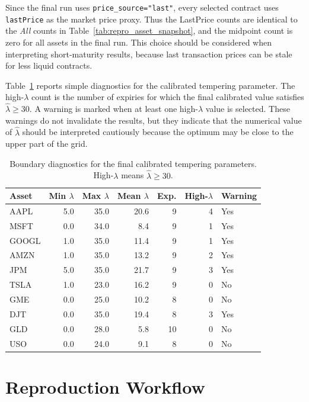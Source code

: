 \documentclass[11pt,a4paper]{report}
\begin{document}
Since the final run uses \texttt{price\_source="last"}, every selected contract uses \texttt{lastPrice} as the market price proxy. Thus the LastPrice counts are identical to the \textit{All} counts in Table~\ref{tab:repro_asset_snapshot}, and the midpoint count is zero for all assets in the final run. This choice should be considered when interpreting short-maturity results, because last transaction prices can be stale for less liquid contracts.

Table~\ref{tab:repro_boundary_diagnostics} reports simple diagnostics for the calibrated tempering parameter. The high-$\lambda$ count is the number of expiries for which the final calibrated value satisfies $\widehat{\lambda}\geq30$. A warning is marked when at least one high-$\lambda$ value is selected. These warnings do not invalidate the results, but they indicate that the numerical value of $\widehat{\lambda}$ should be interpreted cautiously because the optimum may be close to the upper part of the grid.

\begin{table}[htbp]
\centering
\scriptsize
\begin{tabular}{lrrrrrl}
\toprule
Asset & Min $\lambda$ & Max $\lambda$ & Mean $\lambda$ & Exp. & High-$\lambda$ & Warning \\
\midrule
AAPL & 5.0 & 35.0 & 20.6 & 9 & 4 & Yes \\
MSFT & 0.0 & 34.0 & 8.4 & 9 & 1 & Yes \\
GOOGL & 1.0 & 35.0 & 11.4 & 9 & 1 & Yes \\
AMZN & 1.0 & 35.0 & 13.2 & 9 & 2 & Yes \\
JPM & 5.0 & 35.0 & 21.7 & 9 & 3 & Yes \\
TSLA & 1.0 & 23.0 & 16.2 & 9 & 0 & No \\
GME & 0.0 & 25.0 & 10.2 & 8 & 0 & No \\
DJT & 0.0 & 35.0 & 19.4 & 8 & 3 & Yes \\
GLD & 0.0 & 28.0 & 5.8 & 10 & 0 & No \\
USO & 0.0 & 24.0 & 9.1 & 8 & 0 & No \\
\bottomrule
\end{tabular}
\caption{Boundary diagnostics for the final calibrated tempering parameters. High-$\lambda$ means $\widehat{\lambda}\geq30$.}
\label{tab:repro_boundary_diagnostics}
\end{table}

\section{Reproduction Workflow}
\end{document}
